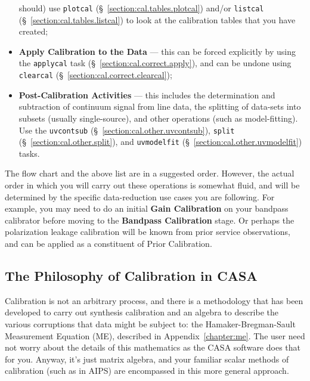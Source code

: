 \begin{itemize}
      should) use {\tt plotcal} (\S~\ref{section:cal.tables.plotcal}) 
      and/or {\tt listcal} (\S~\ref{section:cal.tables.listcal})
      to look at the calibration tables that you have created;
   \item {\bf Apply Calibration to the Data} --- this can be forced
      explicitly by using the {\tt applycal} task
      (\S~\ref{section:cal.correct.apply}), and can be undone using
      {\tt clearcal} (\S~\ref{section:cal.correct.clearcal});
   \item {\bf Post-Calibration Activities} --- this includes the
      determination and subtraction of continuum signal from line
      data, the splitting of data-sets into subsets (usually
      single-source), and other operations (such as model-fitting).
      Use the {\tt uvcontsub} (\S~\ref{section:cal.other.uvcontsub}),
      {\tt split} (\S~\ref{section:cal.other.split}),
      and {\tt uvmodelfit} (\S~\ref{section:cal.other.uvmodelfit})
      tasks.
\end{itemize}

The flow chart and the above list are in a suggested order.  However,
the actual order in which you will carry out these operations is
somewhat fluid, and will be determined by the specific data-reduction
use cases you are following.  For example, you may need to do an
initial {\bf Gain Calibration} on your bandpass calibrator before
moving to the {\bf Bandpass Calibration} stage.  Or perhaps the
polarization leakage calibration will be known from prior service 
observations, and can be applied as a constituent of Prior Calibration.

\subsection{The Philosophy of Calibration in CASA}
\label{section:cal.flow.philo}

Calibration is not an arbitrary process, and there is
a methodology that has been developed to carry out synthesis
calibration and an algebra to describe the various corruptions
that data might be subject to: the Hamaker-Bregman-Sault Measurement
Equation (ME), described in Appendix~\ref{chapter:me}.
The user need not worry about the details of this mathematics
as the CASA software does that for you.  Anyway, it's just
matrix algebra, and your familiar scalar methods of calibration
(such as in AIPS) are encompassed in this more general approach.

